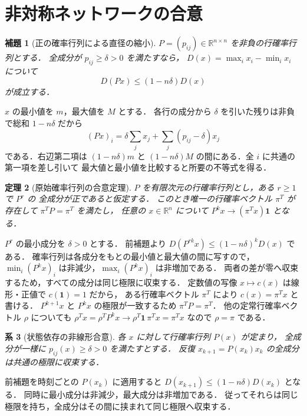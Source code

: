 \documentclass[a5paper,10pt,onecolumn]{jsarticle}
\makeatletter
\theoremstyle{mathnotetheorem}
\newtheorem{theorem}{定理}[section]
\newtheorem{lemma}[theorem]{補題}
\newtheorem{corollary}[theorem]{系}
\renewcommand{\proofname}{証明}
\renewenvironment{proof}[1][\proofname]{%
  \par\pushQED{\qed}\normalfont\topsep4\p@\@plus2\p@\relax
  \trivlist\item[\hskip\labelsep\bfseries #1]\ignorespaces
}{\popQED\endtrivlist\@endpefalse}
\makeatother
\begin{document}
\section{非対称ネットワークの合意}
\begin{lemma}[正の確率行列による直径の縮小]
$P=(p_{ij})\in\mathbb R^{n\times n}$ を非負の行確率行列とする．
全成分が $p_{ij}\ge\delta>0$ を満たすなら，
$D(x)=\max_i x_i-\min_i x_i$ について
\[
 D(Px)\le(1-n\delta)D(x)
\]
が成立する．
\end{lemma}
\begin{proof}
$x$ の最小値を $m$，最大値を $M$ とする．
各行の成分から $\delta$ を引いた残りは非負で総和 $1-n\delta$ だから
\[
 (Px)_i=\delta\sum_jx_j+
 \sum_j(p_{ij}-\delta)x_j
\]
である．右辺第二項は $(1-n\delta)m$ と
$(1-n\delta)M$ の間にある．全 $i$ に共通の第一項を差し引いて
最大値と最小値を比較すると所要の不等式を得る．
\end{proof}
\begin{theorem}[原始確率行列の合意定理]
$P$ を有限次元の行確率行列とし，ある $r\ge1$ で $P^r$ の
全成分が正であると仮定する．
このとき唯一の行確率ベクトル $\pi^T$ が存在して
$\pi^TP=\pi^T$ を満たし，
任意の $x\in\mathbb R^n$ について
$P^kx\to(\pi^Tx)\mathbf1$ となる．
\end{theorem}
\begin{proof}
$P^r$ の最小成分を $\delta>0$ とする．
前補題より $D(P^{rk}x)\le(1-n\delta)^kD(x)$ である．
確率行列は各成分をもとの最小値と最大値の間に写すので，
$\min_i(P^kx)_i$ は非減少，$\max_i(P^kx)_i$ は非増加である．
両者の差が零へ収束するため，すべての成分は同じ極限に収束する．
定数値の写像 $x\mapsto c(x)$ は線形・正値で $c(\mathbf1)=1$ だから，
ある行確率ベクトル $\pi^T$ により $c(x)=\pi^Tx$ と書ける．
$P^{k+1}x$ と $P^kx$ の極限が一致するため $\pi^TP=\pi^T$．
他の定常行確率ベクトル $\rho$ についても
$\rho^Tx=\rho^TP^kx\to\rho^T\mathbf1\,\pi^Tx=\pi^Tx$ なので
$\rho=\pi$ である．
\end{proof}
\begin{corollary}[状態依存の非線形合意]
各 $x$ に対して行確率行列 $P(x)$ が定まり，
全成分が一様に $p_{ij}(x)\ge\delta>0$ を満たすとする．
反復 $x_{k+1}=P(x_k)x_k$ の全成分は共通の極限に収束する．
\end{corollary}
\begin{proof}
前補題を時刻ごとの $P(x_k)$ に適用すると
$D(x_{k+1})\le(1-n\delta)D(x_k)$ となる．
同時に最小成分は非減少，最大成分は非増加である．
従ってそれらは同じ極限を持ち，全成分はその間に挟まれて同じ極限へ収束する．
\end{proof}
\end{document}
